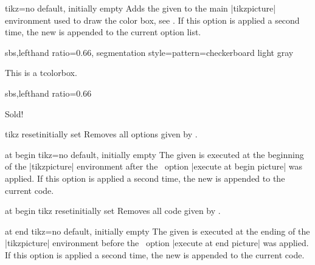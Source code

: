 \begin{docTcbKey}{tikz}{=}{no default, initially empty}
  Adds the given  to the main |tikzpicture| environment
  used to draw the color box, see \cite{tantau:2015a}. If this option is
  applied a second time, the new  is appended to the
  current option list.
\begin{dispExample*}{sbs,lefthand ratio=0.66,
  segmentation style={pattern=checkerboard light gray}}

\begin{tcolorbox}[title=Transparent box,
  tikz={opacity=0.5,transparency group}]
This is a tcolorbox.
\end{tcolorbox}
\end{dispExample*}

\begin{dispExample*}{sbs,lefthand ratio=0.66}

\begin{tcolorbox}[title=Rotated box,
  tikz={rotate=30}]
Sold!
\end{tcolorbox}
\end{dispExample*}

\end{docTcbKey}


\begin{docTcbKey}{tikz reset}{}{initially set}
  Removes all options given by .
\end{docTcbKey}


\begin{docTcbKey}{at begin tikz}{=}{no default, initially empty}
  The given  is executed at the beginning of the |tikzpicture| environment
  after the \tikzname\  option |execute at begin picture| was applied.
  If this option is applied a second time, the new  is appended to the current code.
\end{docTcbKey}


\begin{docTcbKey}{at begin tikz reset}{}{initially set}
  Removes all code given by .
\end{docTcbKey}


\begin{docTcbKey}{at end tikz}{=}{no default, initially empty}
  The given  is executed at the ending of the |tikzpicture| environment
  before the \tikzname\  option |execute at end picture| was applied.
  If this option is applied a second time, the new  is appended to the current code.
\end{docTcbKey}


